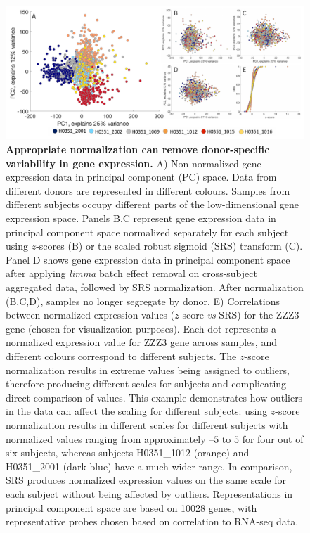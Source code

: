 \begin{figure}[h!]
  \centering
    \includegraphics[width=1\textwidth]{Chapter4/Ch4Fig6.pdf}
\caption{\textbf{Appropriate normalization can remove donor-specific variability in gene expression.}
A) Non-normalized gene expression data in principal component (PC) space. Data from different donors are represented in different colours. Samples from different subjects occupy different parts of the low-dimensional gene expression space. Panels B,C represent gene expression data in principal component space normalized separately for each subject using $z$-scores
(B) or the scaled robust sigmoid (SRS) transform (C). Panel D shows gene expression data in principal component space after applying \textit{limma} batch effect removal \citep{Ritchie2015} on cross-subject aggregated data, followed by SRS normalization. After normalization (B,C,D), samples no longer segregate by donor. E) Correlations between normalized expression values ($z$-score \textit{vs} SRS) for the ZZZ3 gene (chosen for visualization purposes).
Each dot represents a normalized expression value for ZZZ3 gene across samples, and different colours correspond to different subjects. The $z$-score normalization results in extreme values being assigned to outliers, therefore producing different scales for subjects and complicating direct comparison of values.
This example demonstrates how outliers in the data can affect the scaling for different subjects: using $z$-score normalization results in different scales for different subjects with normalized values ranging from approximately $–5$ to $5$ for four out of six subjects, whereas subjects H0351\_1012 (orange) and H0351\_2001 (dark blue) have a much wider range. In comparison, SRS produces normalized expression values on the same scale for each subject without being affected by outliers.
Representations in principal component space are based on \num{10028} genes, with representative probes chosen based on correlation to RNA-seq data. }
\label{fig:Ch4Fig6}
\end{figure}

